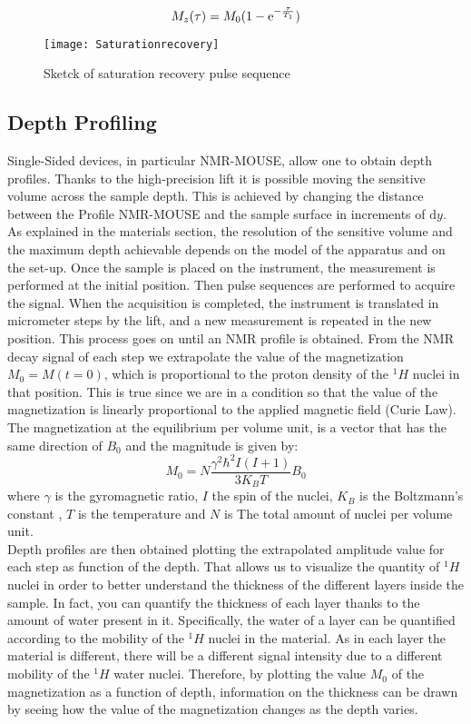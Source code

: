 \documentclass[a4paper,11pt]{report}
\begin{document}
\begin{equation}
	\large{ M_z(\tau)=M_0(1- \mathrm{e}^{- \frac{\tau}{T_1}})}
\end{equation}


\begin{figure}[h]
      	\centering
      	\texttt{[image: Saturationrecovery]}
      	\caption{Sketck of saturation recovery pulse sequence}\label{satrecovery}
      \end{figure}




\subsection{Depth Profiling}

Single-Sided devices, in particular NMR-MOUSE, allow one to obtain depth profiles. Thanks to the high-precision lift it is possible moving the sensitive volume across the sample depth. This is achieved by changing the distance between the Profile NMR-MOUSE and the sample surface in increments of $\mathrm{d}y$. As explained in the materials section, the resolution of the sensitive volume and the maximum depth achievable depends on the model of the apparatus and on the set-up.
Once the sample is placed on the instrument, the measurement is performed at the initial position. Then pulse sequences are performed to acquire the signal. When the acquisition is completed, the instrument is translated in micrometer steps by the lift, and a new measurement is repeated in the new position. This process goes on until an NMR profile is obtained.
  From the NMR decay signal of each step we extrapolate the value of the magnetization $M_0=M(t=0)$,  which is proportional to the proton density of the $^1H$ nuclei in that position. This is true since we are in a condition so that the value of the magnetization is linearly proportional to the applied magnetic field (Curie Law). The magnetization at the equilibrium per volume unit, is a vector that has the same direction of $B_0$ and the magnitude is given by:
\begin{equation} \label{modulo magnetizzazione}
	M_0=N \frac{\gamma^2 \hbar^2 I (I+1)}{3K_BT}B_0
\end{equation}
where $\gamma$ is the gyromagnetic ratio, $I$ the spin of the nuclei, $K_B$ is the Boltzmann's constant , $T$ is the temperature and  $N$ is The total amount of nuclei per volume unit.\\
Depth profiles are then obtained plotting the extrapolated amplitude value for each step as function of the depth. That allows us to visualize the quantity of $^1H$ nuclei in order to better understand the thickness of the different layers inside the sample. In fact, you can quantify the thickness of each layer thanks to the amount of water present in it. Specifically, the water of a layer can be quantified according to the mobility of the $^1H$ nuclei in the material. As in each layer the material is different, there will be a different signal intensity due to a different mobility of the $^1H$ water nuclei. Therefore, by plotting the value $M_0$ of the magnetization as a function of depth, information on the thickness can be drawn by seeing how the value of the magnetization changes as the depth varies.
\end{document}
